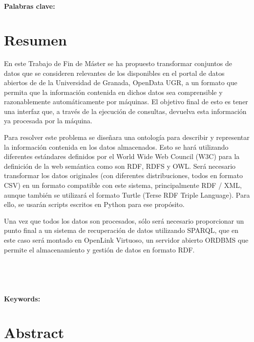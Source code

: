 \begin{center}
{\LARGE\bfseries\titulo}\\
\end{center}
\begin{center}
\autor\
\end{center}

\textbf{Palabras clave: }{\keywordsEs}

\section*{Resumen}

En este Trabajo de Fin de Máster se ha propuesto transformar conjuntos de datos que se consideren relevantes de los disponibles en el portal de datos abiertos de de la Universidad de Granada, OpenData UGR, a un formato que permita que la información contenida en dichos datos sea comprensible y razonablemente automáticamente por máquinas. El objetivo final de esto es tener una interfaz que, a través de la ejecución de consultas, devuelva esta información ya procesada por la máquina.

\bigskip
Para resolver este problema se diseñara una ontología para describir y representar la información contenida en los datos almacenados. Esto se hará utilizando diferentes estándares definidos por el World Wide Web Council (W3C) para la definición de la web semántica como son RDF, RDFS y OWL. Será necesario transformar los datos originales (con diferentes distribuciones, todos en formato CSV) en un formato compatible con este sistema, principalmente RDF / XML, aunque también se utilizará el formato Turtle (Terse RDF Triple Language). Para ello, se usarán scripts escritos en Python para ese propósito.

\bigskip
Una vez que todos los datos son procesados, sólo será necesario proporcionar un punto final a un sistema de recuperación de datos utilizando SPARQL, que en este caso será montado en OpenLink Virtuoso, un servidor abierto ORDBMS que permite el almacenamiento y gestión de datos en formato RDF.

\newpage
\begin{center}
{\LARGE\bfseries\tituloEng}\\
\end{center}
\begin{center}
\autor\
\end{center}

\textbf{Keywords: }{\keywordsEn}

\section*{Abstract}

